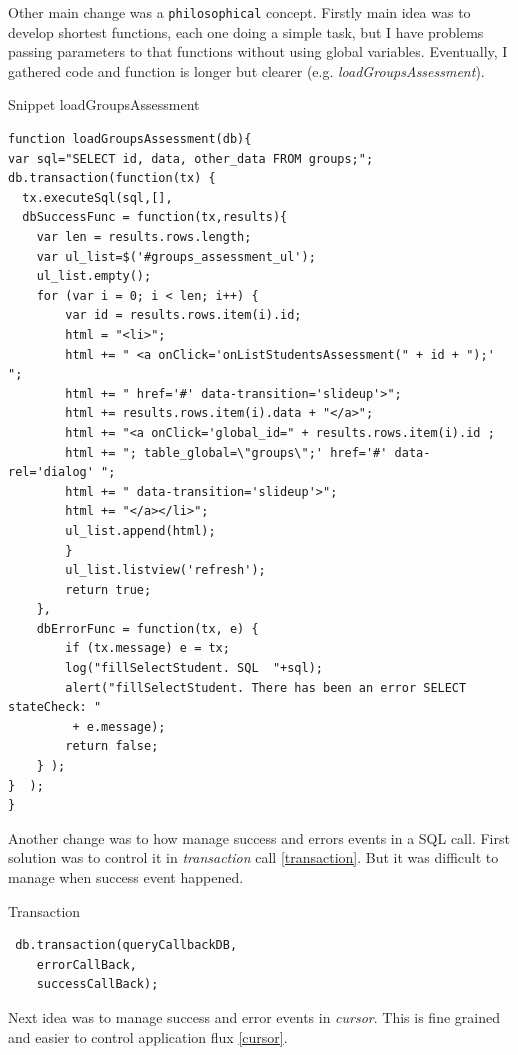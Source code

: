 Other main change was a \texttt{philosophical} concept. Firstly main idea was to develop shortest functions,
each one doing a simple task, but I have problems passing parameters to that functions without using global variables.
Eventually, I gathered code and function is longer but clearer (e.g. \emph{loadGroupsAssessment}).
\begin{bclogo}[couleur=blue!30,arrondi=0.1,ombre=true ] 
{Snippet loadGroupsAssessment}
\begin{verbatim}
function loadGroupsAssessment(db){
var sql="SELECT id, data, other_data FROM groups;";
db.transaction(function(tx) {
  tx.executeSql(sql,[],
  dbSuccessFunc = function(tx,results){
    var len = results.rows.length;
    var ul_list=$('#groups_assessment_ul');
    ul_list.empty();
    for (var i = 0; i < len; i++) {
        var id = results.rows.item(i).id;
        html = "<li>";
        html += " <a onClick='onListStudentsAssessment(" + id + ");' ";
        html += " href='#' data-transition='slideup'>";
        html += results.rows.item(i).data + "</a>";
        html += "<a onClick='global_id=" + results.rows.item(i).id ;
        html += "; table_global=\"groups\";' href='#' data-rel='dialog' "; 
        html += " data-transition='slideup'>";
        html += "</a></li>";
        ul_list.append(html);
        }
        ul_list.listview('refresh');
        return true;
    },
    dbErrorFunc = function(tx, e) {
        if (tx.message) e = tx;
        log("fillSelectStudent. SQL  "+sql);
        alert("fillSelectStudent. There has been an error SELECT  stateCheck: "
         + e.message);
        return false;
    } );
}  );
}
\end{verbatim}
\end{bclogo}

Another change was to how manage success and errors events in a SQL call.
First solution was to control it in \emph{transaction} call  \ref{transaction}. But
it was difficult to manage when success event happened.

\begin{bclogo}[couleur=blue!30,arrondi=0.1,ombre=true ] 
{Transaction \label{transaction} }
\begin{verbatim}
 db.transaction(queryCallbackDB, 
    errorCallBack, 
    successCallBack);
\end{verbatim}
\end{bclogo}

Next idea was to manage success and error events in \emph{cursor}.
This is fine grained and easier to control application flux \ref{cursor}.

